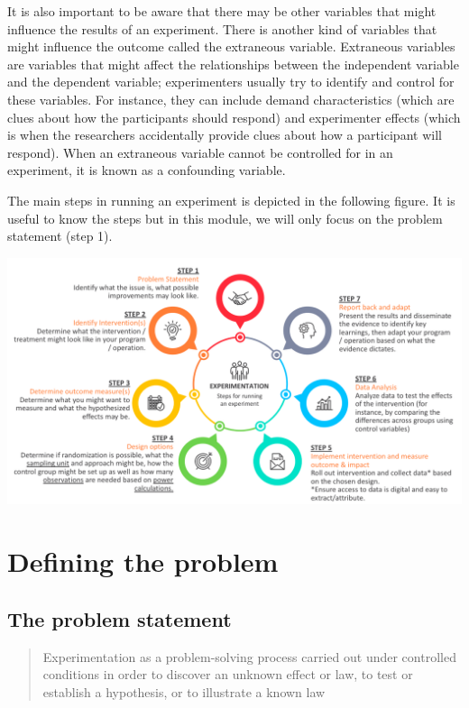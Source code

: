 \documentclass[openany]{book}
\begin{document}
It is also important to be aware that there may be other variables that might influence the results of an experiment. There is another kind of variables that might influence the outcome called the extraneous variable. Extraneous variables are variables that might affect the relationships between the independent variable and the dependent variable; experimenters usually try to identify and control for these variables. For instance, they can include demand characteristics (which are clues about how the participants should respond) and experimenter effects (which is when the researchers accidentally provide clues about how a participant will respond). When an extraneous variable cannot be controlled for in an experiment, it is known as a confounding variable.

The main steps in running an experiment is depicted in the following figure. It is useful to know the steps but in this module, we will only focus on the problem statement (step 1).

\includegraphics{fig/running-experiment.png}

\hypertarget{defining-the-problem}{%
\chapter{Defining the problem}\label{defining-the-problem}}

\hypertarget{the-problem-statement}{%
\section{The problem statement}\label{the-problem-statement}}

\begin{quote}
Experimentation as a problem-solving process carried out under controlled conditions in order to discover an unknown effect or law, to test or establish a hypothesis, or to illustrate a known law
\end{quote}
\end{document}
